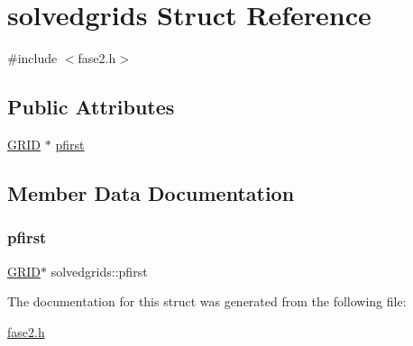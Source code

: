 \hypertarget{structsolvedgrids}{}\section{solvedgrids Struct Reference}
\label{structsolvedgrids}


{\ttfamily \#include $<$fase2.\+h$>$}

\subsection*{Public Attributes}
\begin{DoxyCompactItemize}
\item 
\mbox{\hyperlink{fase2_8h_ad0603fcf4c7ef7a380969d4efc9f93bc}{G\+R\+ID}} $\ast$ \mbox{\hyperlink{structsolvedgrids_a83a5cff84da0318c1299edd789a0b177}{pfirst}}
\end{DoxyCompactItemize}


\subsection{Member Data Documentation}
\mbox{\label{structsolvedgrids_a83a5cff84da0318c1299edd789a0b177}} 
\subsubsection{\texorpdfstring{pfirst}{pfirst}}
{\footnotesize\ttfamily \mbox{\hyperlink{fase2_8h_ad0603fcf4c7ef7a380969d4efc9f93bc}{G\+R\+ID}}$\ast$ solvedgrids\+::pfirst}



The documentation for this struct was generated from the following file\+:\begin{DoxyCompactItemize}
\item 
\mbox{\hyperlink{fase2_8h}{fase2.\+h}}\end{DoxyCompactItemize}
